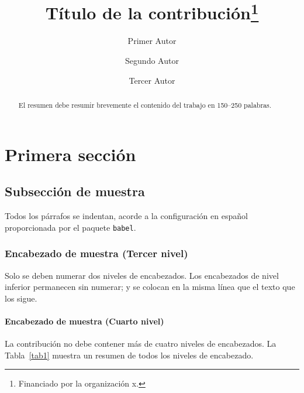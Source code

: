 \documentclass{sistedes}
\begin{document}
%
\title{Título de la contribución\thanks{Financiado por la organización x.}}
%
%
\author{Primer Autor \and
Segundo Autor \and
Tercer Autor}
%
%

%
\maketitle              %
%
\begin{abstract}
El resumen debe resumir brevemente el contenido del trabajo en
150--250 palabras.

\end{abstract}
%
%
%
\section{Primera sección}
\subsection{Subsección de muestra}
Todos los párrafos se indentan, acorde a la configuración en español 
proporcionada por el paquete \verb|babel|.

\subsubsection{Encabezado de muestra (Tercer nivel)}
Solo se deben numerar dos niveles de encabezados. Los encabezados de nivel
inferior permanecen sin numerar; y se colocan en la misma línea que el texto
que los sigue.

\paragraph{Encabezado de muestra (Cuarto nivel)}
La contribución no debe contener más de cuatro niveles de encabezados.
La Tabla~\ref{tab1} muestra un resumen de todos los niveles de encabezado.
\end{document}
